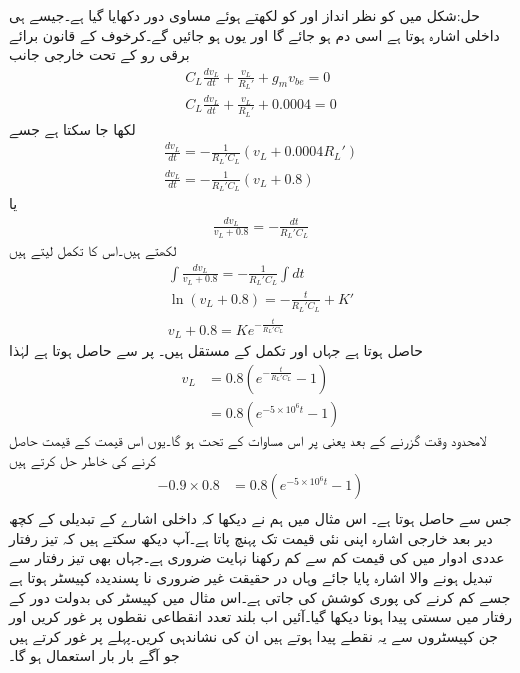 حل:شکل  میں  کو نظر انداز اور  کو  لکھتے ہوئے مساوی دور دکھایا گیا ہے۔جیسے ہی داخلی اشارہ   ہوتا ہے اسی دم  ہو جائے گا اور یوں  ہو جائیں گے۔کرخوف کے قانون برائے برقی رو کے تحت خارجی جانب
\begin{align*}
C_L \frac{d v_L}{d t}+\frac{v_L}{R_L'} +g_m v_{be}=0\\
C_L \frac{d v_L}{d t}+\frac{v_L}{R_L'} +0.0004=0
\end{align*}
لکھا جا سکتا ہے جسے
\begin{align*}
\frac{d v_L}{d t}=-\frac{1}{R_L' C_L}\left(v_L +0.0004 R_L' \right)\\
\frac{d v_L}{d t}=-\frac{1}{R_L' C_L}\left(v_L +0.8 \right)
\end{align*}
یا
\begin{align*}
\frac{d v_L}{v_L +0.8}=-\frac{dt}{R_L' C_L}
\end{align*}
لکھتے ہیں۔اس کا تکمل لیتے ہیں
\begin{align*}
\int \frac{d v_L}{v_L +0.8}=-\frac{1}{R_L' C_L}\int  dt\\
\ln \left(v_L+0.8 \right)=-\frac{t}{R_L' C_L}+K'\\
v_L+0.8=K e^{-\frac{t}{R_L'C_L}}
\end{align*}
حاصل ہوتا ہے جہاں  اور  تکمل کے مستقل ہیں۔ پر  سے  حاصل ہوتا ہے لہٰذا
\begin{align*}
v_L&=0.8 \left(e^{-\frac{t}{R_L'C_L}} -1\right)\\
&=0.8 \left(e^{-5\times 10^6 t} -1\right)
\end{align*}
لامحدود وقت گزرنے کے بعد یعنی  پر  اس مساوات کے تحت  ہو گا۔یوں اس قیمت کے  قیمت حاصل کرنے کی خاطر حل کرتے ہیں
\begin{align*}
-0.9 \times 0.8 &=0.8 \left(e^{-5\times 10^6 t} -1\right)\\
\end{align*}
جس سے  حاصل ہوتا ہے۔
اس مثال میں ہم نے دیکھا کہ داخلی اشارے کے تبدیلی کے کچھ دیر بعد خارجی اشارہ اپنی نئی قیمت تک پہنچ پاتا ہے۔آپ دیکھ سکتے ہیں کہ تیز رفتار عددی ادوار میں  کی قیمت کم سے کم رکھنا نہایت ضروری ہے۔جہاں بھی تیز رفتار سے تبدیل ہونے والا اشارہ پایا جائے وہاں   در حقیقت غیر ضروری نا پسندیدہ کپیسٹر ہوتا ہے جسے کم کرنے کی پوری کوشش کی جاتی ہے۔اس مثال میں کپیسٹر کی بدولت دور کے رفتار میں سستی پیدا ہونا دیکھا گیا۔آئیں اب بلند تعدد انقطاعی نقطوں پر غور کریں اور جن کپیسٹروں سے یہ نقطے پیدا ہوتے ہیں ان کی نشاندہی کریں۔پہلے  پر غور کرتے ہیں جو آگے بار بار استعمال ہو گا۔

